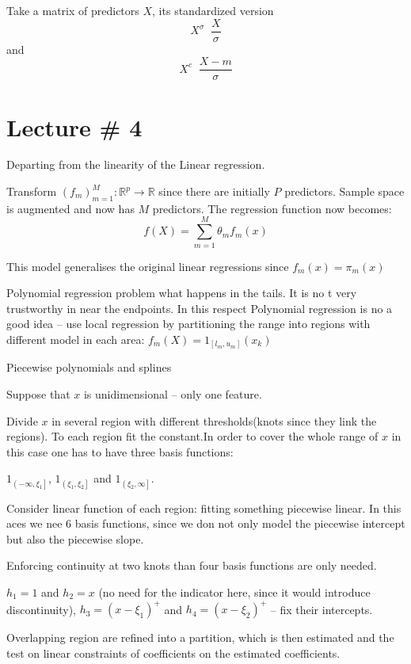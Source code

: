 \documentclass[a4paper]{article}
\newcommand{\clo}[1]{{\left [ #1 \right ]}}
\newcommand{\ploc}[1]{{\left ( #1 \right ]}}
\newcommand{\brac}[1]{{\left ( #1 \right )}}
\newcommand{\Real}{\mathbb{R}}
\newcommand{\defn}{\mathop{\overset{\Delta}{=}}\nolimits}
\begin{document}

Take a matrix of predictors $X$, its standardized version \[X^\sigma \defn \frac{X}{\sigma}\]
and \[X^c \defn \frac{X-m}{\sigma}\]



\section{Lecture \# 4} %
\label{sec:lecture_4}
Departing from the linearity of the Linear regression.

Transform $\brac{f_m}_{m=1}^M:\Real^p \to \Real$ since there are initially $P$ predictors.
Sample space is augmented and now has $M$ predictors. The regression function now becomes:
\[f(X) = \sum_{m=1}^M \theta_m f_m(x)\]

This model generalises the original linear regressions since $f_m(x) = \pi_m(x)$ 

Polynomial regression problem what happens in the tails. It is no t very trustworthy in near the endpoints.
In this respect Polynomial regression is no a good idea -- use local regression by partitioning the range into regions with different model in each area: $f_m(X) = 1_{\clo{l_m, u_m}}(x_k)$

Piecewise polynomials and splines

Suppose that $x$ is unidimensional -- only one feature.

Divide $x$ in several region with different thresholds(knots since they link the regions). To each region fit the constant.In order to cover the whole range of $x$ in this case one has to have three basis functions:

$1_{\ploc{-\infty, \xi_1}}$, $1_{\ploc{\xi_1, \xi_2}}$ and $1_{\ploc{\xi_2, \infty}}$.

Consider linear function of each region: fitting something piecewise linear. In this aces we nee 6 basis functions, since we don not only model the piecewise intercept but also the piecewise slope.

Enforcing continuity at two knots than four basis functions are only needed.

$h_1 = 1$ and $h_2 = x$ (no need for the indicator here, since it would introduce discontinuity), $h_3 = \brac{x-\xi_1}^+$ and $h_4 = \brac{x-\xi_2}^+$ -- fix their intercepts.

Overlapping region are refined into a partition, which is then estimated and the test on linear constraints of coefficients on the estimated coefficients.
\end{document}
